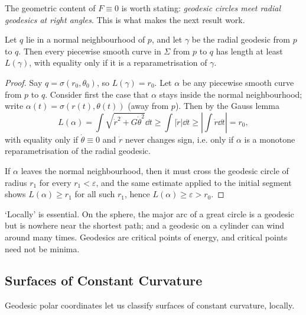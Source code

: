 The geometric content of $F \equiv 0$ is worth stating: \emph{geodesic circles meet radial geodesics at right angles}. This is what makes the next result work.

\begin{proposition}
    Let $q$ lie in a normal neighbourhood of $p$, and let $\gamma$ be the radial geodesic from $p$ to $q$. Then every piecewise smooth curve in $\Sigma$ from $p$ to $q$ has length at least $L(\gamma)$, with equality only if it is a reparametrisation of $\gamma$.
\end{proposition}
\begin{proof}
    Say $q = \sigma(r_0, \theta_0)$, so $L(\gamma) = r_0$. Let $\alpha$ be any piecewise smooth curve from $p$ to $q$. Consider first the case that $\alpha$ stays inside the normal neighbourhood; write $\alpha(t) = \sigma(r(t), \theta(t))$ (away from $p$). Then by the Gauss lemma
    $$
    L(\alpha) = \int \sqrt{\dot r^2 + G\dot\theta^2}\dd t \geq \int |\dot r| \dd t \geq \left|\int \dot r \dd t\right| = r_0,
    $$
    with equality only if $\dot\theta \equiv 0$ and $\dot r$ never changes sign, i.e. only if $\alpha$ is a monotone reparametrisation of the radial geodesic.

    If $\alpha$ leaves the normal neighbourhood, then it must cross the geodesic circle of radius $r_1$ for every $r_1 < \varepsilon$, and the same estimate applied to the initial segment shows $L(\alpha) \geq r_1$ for all such $r_1$, hence $L(\alpha) \geq \varepsilon > r_0$.
\end{proof}

\begin{remark}
    `Locally' is essential. On the sphere, the major arc of a great circle is a geodesic but is nowhere near the shortest path; and a geodesic on a cylinder can wind around many times. Geodesics are critical points of energy, and critical points need not be minima.
\end{remark}

\subsection{Surfaces of Constant Curvature}

Geodesic polar coordinates let us classify surfaces of constant curvature, locally.

